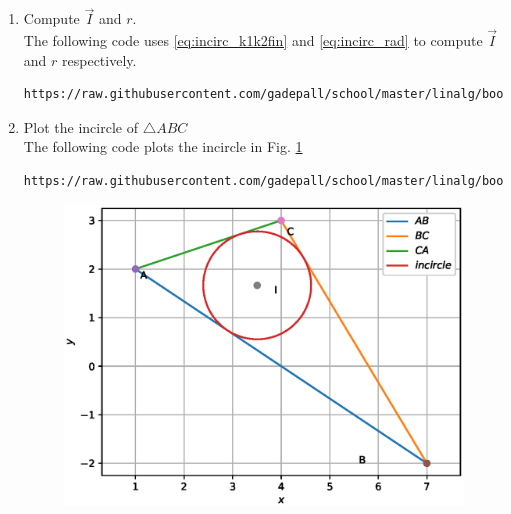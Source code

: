 \begin{enumerate}[label=\arabic*.,ref=\thesubsection.\theenumi]
\item Compute $\vec{I}$ and $r$.
\\
\solution The following code uses \eqref{eq:incirc_k1k2fin}  and \eqref{eq:incirc_rad} to compute $\vec{I}$ and  $r$ respectively.


\begin{lstlisting}
https://raw.githubusercontent.com/gadepall/school/master/linalg/book/codes/incentre.py
\end{lstlisting}
\item Plot the incircle of $\triangle ABC$
\\
\solution The following code plots the incircle in Fig. \ref{fig:incircle}
\begin{lstlisting}
https://raw.githubusercontent.com/gadepall/school/master/linalg/book/codes/incircle.py
\end{lstlisting}
\begin{figure}
\centering
\includegraphics[width=\columnwidth]{./circle/figs/incircle.eps}
\caption{}
\label{fig:incircle}
\end{figure}

\end{enumerate}


